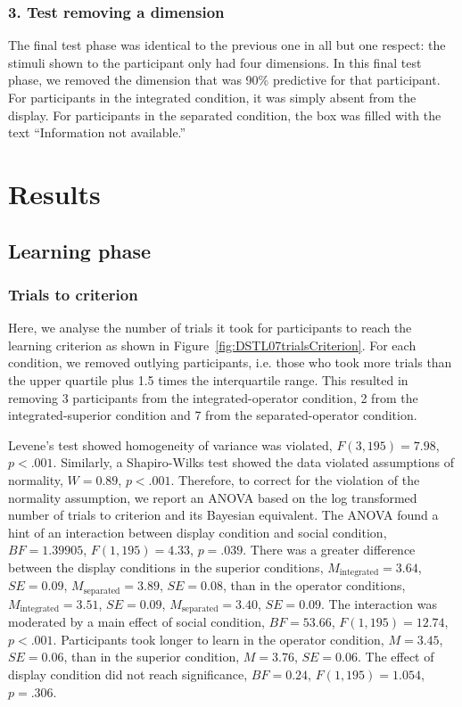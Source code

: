 \documentclass[doc, a4paper, apacite]{apa6}
\begin{document}
\subsubsection{3. Test removing a dimension}
The final test phase was identical to the previous one in all but one respect: the stimuli shown to the participant only had four dimensions. 
In this final test phase, we removed the dimension that was 90\% predictive for that participant. 
For participants in the integrated condition, it was simply absent from the display. 
For participants in the separated condition, the box was filled with the text ``Information not available.''

\section{Results}

\subsection{Learning phase}
\subsubsection{Trials to criterion}
Here, we analyse the number of trials it took for participants to reach the learning criterion as shown in Figure~\ref{fig:DSTL07trialsCriterion}. 
For each condition, we removed outlying participants, i.e. those who took more trials than the upper quartile plus 1.5 times the interquartile range. 
This resulted in removing 3 participants from the integrated-operator condition, 2 from the integrated-superior condition and 7 from the separated-operator condition. 

Levene's test showed homogeneity of variance was violated, $F(3,195)=7.98$, $p<.001$.
Similarly, a Shapiro-Wilks test showed the data violated assumptions of normality, $W=0.89$, $p<.001$. 
Therefore, to correct for the violation of the normality assumption, we report an ANOVA based on the log transformed number of trials to criterion and its Bayesian equivalent. 
The ANOVA found a hint of an interaction between display condition and social condition, $BF=1.39905$, $F(1, 195)=4.33$, $p=.039$. 
There was a greater difference between the display conditions in the superior conditions, $M_\text{integrated}=3.64$, $SE=0.09$, $M_\text{separated}=3.89$, $SE=0.08$, than in the operator conditions, $M_\text{integrated}=3.51$, $SE=0.09$, $M_\text{separated}=3.40$, $SE=0.09$. 
The interaction was moderated by a main effect of social condition, $BF=53.66$, $F(1, 195)=12.74$, $p<.001$. 
Participants took longer to learn in the operator condition, $M=3.45$, $SE=0.06$, than in the superior condition, $M=3.76$, $SE=0.06$. 
The effect of display condition did not reach significance, $BF=0.24$, $F(1, 195)=1.054$, $p=.306$. 
\end{document}
